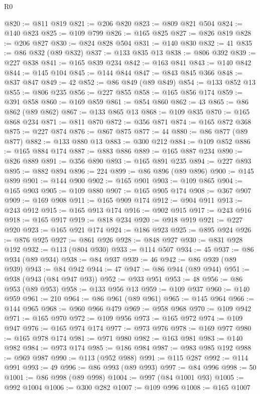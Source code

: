 \begin{lexlean}{R0}
\begin{coremodule}
@820 := @811 @819
@821 := @206 @820
@823 := @809 @821 @504
@824 := @140 @823
@825 := @109 @799
@826 := @165 @825
@827 := @826 @819
@828 := @206 @827
@830 := @824 @828 @504
@831 := @140 @830
@832 := 41
@835 := @86 @832 (@89 @832)
@837 := @133 @835 @13
@838 := @806 @392
@839 := @227 @838
@841 := @165 @839 @234
@842 := @163 @841
@843 := @140 @842
@844 := @145 @104
@845 := @144 @844
@847 := @843 @845 @366
@848 := @837 @847
@849 := 42
@852 := @86 @849 (@89 @849)
@854 := @133 @852 @13
@855 := @806 @235
@856 := @227 @855
@858 := @165 @856 @174
@859 := @391 @858
@860 := @169 @859
@861 := @854 @860
@862 := 43
@865 := @86 @862 (@89 @862)
@867 := @133 @865 @13
@868 := @109 @835
@870 := @165 @868 @234
@871 := @811 @870
@872 := @356 @871
@874 := @165 @872 @368
@875 := @227 @874
@876 := @867 @875
@877 := 44
@880 := @86 @877 (@89 @877)
@882 := @133 @880 @13
@883 := @300 @212
@884 := @109 @852
@886 := @165 @884 @174
@887 := @883 @886
@889 := @165 @887 @234
@890 := @826 @889
@891 := @356 @890
@893 := @165 @891 @235
@894 := @227 @893
@895 := @882 @894
@896 := 224
@899 := @86 @896 (@89 @896)
@900 := @145 @899
@901 := @144 @900
@902 := @165 @901
@903 := @109 @865
@904 := @165 @903
@905 := @109 @880
@907 := @165 @905 @174
@908 := @367 @907
@909 := @169 @908
@911 := @165 @909 @174
@912 := @904 @911
@913 := @243 @912
@915 := @165 @913 @174
@916 := @902 @915
@917 := @243 @916
@918 := @165 @917
@919 := @818 @234
@920 := @918 @919
@921 := @227 @920
@923 := @165 @921 @174
@924 := @186 @923
@925 := @895 @924
@926 := @876 @925
@927 := @861 @926
@928 := @848 @927
@930 := @831 @928 @192
@932 := @113 (@804 @930)
@933 := @114 @507
@934 := 45
@937 := @86 @934 (@89 @934)
@938 := @84 @937
@939 := 46
@942 := @86 @939 (@89 @939)
@943 := @84 @942
@944 := 47
@947 := @86 @944 (@89 @944)
@951 := @938 (@943 (@84 @947 @93))
@952 := @933 @951
@953 := 48
@956 := @86 @953 (@89 @953)
@958 := @133 @956 @13
@959 := @109 @937
@960 := @140 @959
@961 := 210
@964 := @86 @961 (@89 @961)
@965 := @145 @964
@966 := @144 @965
@968 := @960 @966 @479
@969 := @958 @968
@970 := @109 @942
@971 := @165 @970
@972 := @109 @956
@973 := @165 @972
@974 := @109 @947
@976 := @165 @974 @174
@977 := @973 @976
@978 := @169 @977
@980 := @165 @978 @174
@981 := @971 @980
@982 := @163 @981
@983 := @140 @982
@984 := @973 @174
@985 := @186 @984
@987 := @983 @985 @192
@988 := @969 @987
@990 := @113 (@952 @988)
@991 := @115 @287
@992 := @114 @991
@993 := 49
@996 := @86 @993 (@89 @993)
@997 := @84 @996
@998 := 50
@1001 := @86 @998 (@89 @998)
@1004 := @997 (@84 @1001 @93)
@1005 := @992 @1004
@1006 := @300 @282
@1007 := @109 @996
@1008 := @165 @1007

\end{coremodule}
\end{lexlean}
